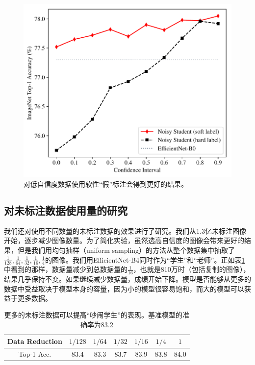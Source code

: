 \documentclass[10pt]{article}
\begin{document}
\label{sec:out_of_domain}
\begin{figure}[h!]     
	\centering     
	\includegraphics[width=0.9\columnwidth]{fig/plot_confidence.pdf}     \caption{对低自信度数据使用软性“假”标注会得到更好的结果。}  
	\label{fig:soft_vs_hard_vary_confidence} 
\end{figure}

\subsection{对未标注数据使用量的研究}
我们还对使用不同数量的未标注数据的效果进行了研究。我们从1.3亿未标注图像开始，逐步减少图像数量。为了简化实验，虽然选高自信度的图像会带来更好的结果，但是我们用均匀抽样（uniform sampling）的方法从整个数据集中抽取了$\frac{1}{128}, \frac{1}{64}, \frac{1}{32}, \frac{1}{16}, \frac{1}{4}$的图像。我们用EfficientNet-B4同时作为“学生”和“老师”。正如表\ref{tab:vary_unlabeled_data}中看到的那样，数据量减少到总数据量的$\frac{1}{16}$，也就是810万时（包括复制的图像），结果几乎保持不变。如果继续减少数据量，成绩开始下降。模型是否能够从更多的数据中受益取决于模型本身的容量，因为小的模型很容易饱和，而大的模型可以获益于更多数据。

\begin{table}[h!]
	\footnotesize
	\centering
	\begin{tabular}{c|cccccc}
		\toprule
		Data Reduction & $1/128$ & $1/64$ & $1/32$ & $1/16$ & $1/4$ & $1$ \\
		\midrule
		Top-1 Acc.  &83.4 & 83.3 & 83.7 & 83.9 & 83.8 & 84.0 \\
		\bottomrule
	\end{tabular}
	\caption{更多的未标注数据可以提高“吵闹学生”的表现。基准模型的准确率为83.2}
	\label{tab:vary_unlabeled_data}
\end{table}
\end{document}
